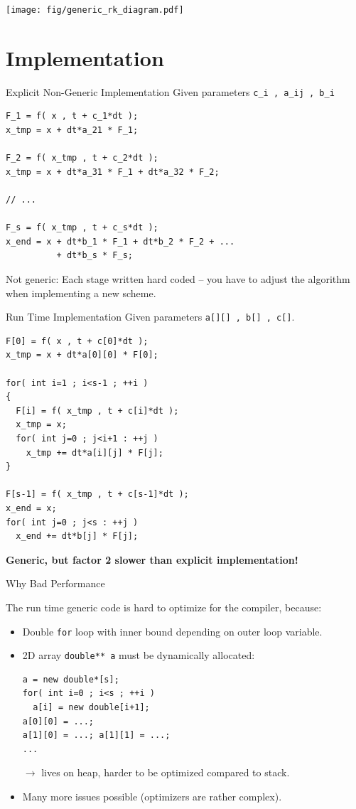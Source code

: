\documentclass{beamer}
\begin{document}
\begin{frame}
 \texttt{[image: fig/generic\_rk\_diagram.pdf]}
\end{frame}

\section{Implementation}

\begin{frame}[fragile]{Explicit Non-Generic Implementation}
Given parameters \lstinline+c_i , a_ij , b_i+ 
\begin{lstlisting}
F_1 = f( x , t + c_1*dt );
x_tmp = x + dt*a_21 * F_1;

F_2 = f( x_tmp , t + c_2*dt );
x_tmp = x + dt*a_31 * F_1 + dt*a_32 * F_2;

// ...

F_s = f( x_tmp , t + c_s*dt );
x_end = x + dt*b_1 * F_1 + dt*b_2 * F_2 + ... 
          + dt*b_s * F_s; 
\end{lstlisting}

Not generic: Each stage written hard coded -- you have to adjust the algorithm when implementing a new scheme.
\end{frame}


\begin{frame}[fragile]{Run Time Implementation}
Given parameters \lstinline+a[][] , b[] , c[]+.
\begin{lstlisting}
F[0] = f( x , t + c[0]*dt );
x_tmp = x + dt*a[0][0] * F[0];

for( int i=1 ; i<s-1 ; ++i )
{
  F[i] = f( x_tmp , t + c[i]*dt );
  x_tmp = x;
  for( int j=0 ; j<i+1 : ++j )
    x_tmp += dt*a[i][j] * F[j];
}

F[s-1] = f( x_tmp , t + c[s-1]*dt );
x_end = x;
for( int j=0 ; j<s : ++j )
  x_end += dt*b[j] * F[j];
\end{lstlisting}

\pause
\textbf{Generic, but factor 2 slower than explicit implementation!}
\end{frame}

\begin{frame}[fragile]{Why Bad Performance}

The run time generic code is hard to optimize for the compiler, because:

\begin{itemize}
 \item Double \lstinline+for+ loop with inner bound depending on outer loop variable.
 \item 2D array \lstinline+double** a+ must be dynamically allocated:
\begin{lstlisting}
a = new double*[s];
for( int i=0 ; i<s ; ++i )
  a[i] = new double[i+1];
a[0][0] = ...; 
a[1][0] = ...; a[1][1] = ...; 
...
\end{lstlisting}
$\longrightarrow$ lives on heap, harder to be optimized compared to stack.
 \item Many more issues possible (optimizers are rather complex).

\end{itemize}

\end{frame}
\end{document}
